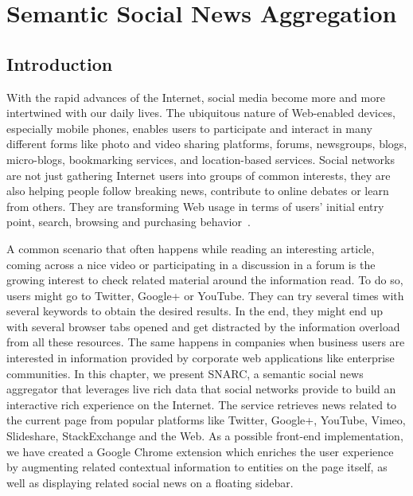 \chapter{Semantic Social News Aggregation}\label{chapter:snarc}
\graphicspath{{Part2/Chapter2/figures/}}

\section{Introduction}
With the rapid advances of the Internet, social media become more and more intertwined with our daily lives. The ubiquitous nature of Web-enabled devices, especially mobile phones, enables users to participate and interact in many different forms like photo and video sharing platforms, forums, newsgroups, blogs, micro-blogs, bookmarking services, and location-based services. Social networks are not just gathering Internet users into groups of common interests, they are also helping people follow breaking news, contribute to online debates or learn from others. They are transforming Web usage in terms of users' initial entry point, search, browsing and purchasing behavior~\cite{Bakshy:WWW:12}.

A common scenario that often happens while reading an interesting article, coming across a nice video or participating in a discussion in a forum is the growing interest to check related material around the information read. To do so, users might go to Twitter, Google+ or YouTube. They can try several times with several keywords to obtain the desired results. In the end, they might end up with several browser tabs opened and get distracted by the information overload from all these resources. The same happens in companies when business users are interested in information provided by corporate web applications like enterprise communities. In this chapter, we present SNARC, a semantic social news aggregator that leverages live rich data that social networks provide to build an interactive rich experience on the Internet. The service retrieves news related to the current page from popular platforms like Twitter, Google+, YouTube, Vimeo, Slideshare, StackExchange and the Web. As a possible front-end implementation, we have created a Google Chrome extension which enriches the user experience by augmenting related contextual information to entities on the page itself, as well as displaying related social news on a floating sidebar.


